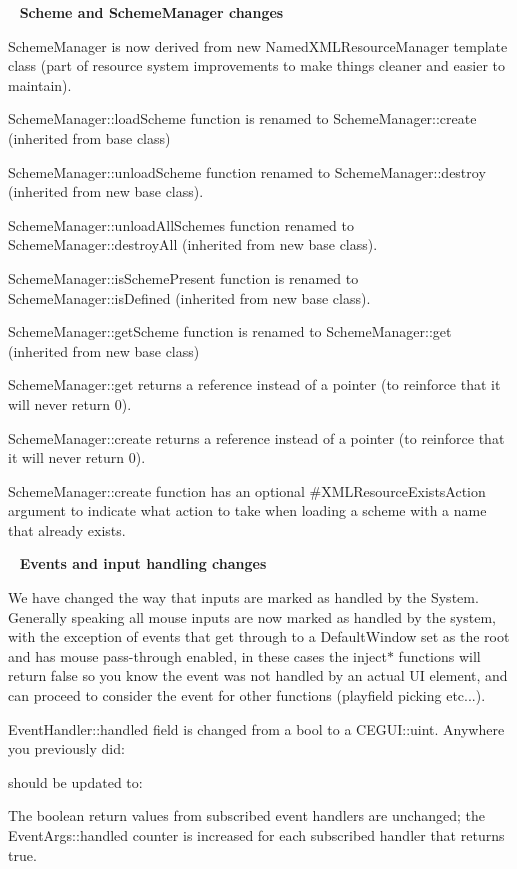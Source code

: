 ~\newline
 {\bfseries{Scheme and Scheme\+Manager changes}}
\begin{DoxyItemize}
\item Scheme\+Manager is now derived from new Named\+X\+M\+L\+Resource\+Manager template class (part of resource system improvements to make things cleaner and easier to maintain).
\item {\ttfamily Scheme\+Manager\+::load\+Scheme} function is renamed to Scheme\+Manager\+::create (inherited from base class)
\item {\ttfamily Scheme\+Manager\+::unload\+Scheme} function renamed to Scheme\+Manager\+::destroy (inherited from new base class).
\item {\ttfamily Scheme\+Manager\+::unload\+All\+Schemes} function renamed to Scheme\+Manager\+::destroy\+All (inherited from new base class).
\item {\ttfamily Scheme\+Manager\+::is\+Scheme\+Present} function is renamed to Scheme\+Manager\+::is\+Defined (inherited from new base class).
\item {\ttfamily Scheme\+Manager\+::get\+Scheme} function is renamed to Scheme\+Manager\+::get (inherited from new base class)
\item Scheme\+Manager\+::get returns a reference instead of a pointer (to reinforce that it will never return 0).
\item Scheme\+Manager\+::create returns a reference instead of a pointer (to reinforce that it will never return 0).
\item Scheme\+Manager\+::create function has an optional \#\+X\+M\+L\+Resource\+Exists\+Action argument to indicate what action to take when loading a scheme with a name that already exists.
\end{DoxyItemize}

~\newline
 {\bfseries{Events and input handling changes}}
\begin{DoxyItemize}
\item We have changed the way that inputs are marked as handled by the System. Generally speaking all mouse inputs are now marked as handled by the system, with the exception of events that get through to a Default\+Window set as the root and has mouse pass-\/through enabled, in these cases the inject$\ast$ functions will return false so you know the event was not handled by an actual UI element, and can proceed to consider the event for other functions (playfield picking etc...).
\item Event\+Handler\+::handled field is changed from a bool to a C\+E\+G\+U\+I\+::uint. Anywhere you previously did\+: 
\begin{DoxyCode}{0}
\end{DoxyCode}
 should be updated to\+: 
\begin{DoxyCode}{0}
\end{DoxyCode}
 The boolean return values from subscribed event handlers are unchanged; the Event\+Args\+::handled counter is increased for each subscribed handler that returns true.
\end{DoxyItemize}

